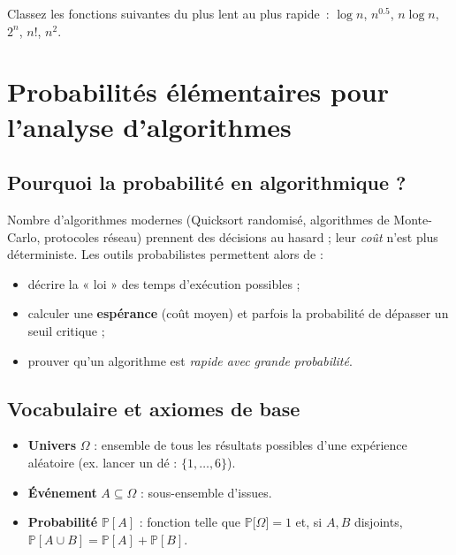 \begin{exercice}
Classez les fonctions suivantes du plus lent au plus rapide :
$\log n$, $n^{0.5}$, $n\log n$, $2^{n}$, $n!$, $n^{2}$.
\end{exercice}



\section{Probabilités élémentaires pour l’analyse d’algorithmes}

\subsection{Pourquoi la probabilité en algorithmique ?}
Nombre d’algorithmes modernes (Quicksort randomisé, algorithmes de Monte-Carlo,
protocoles réseau) prennent des décisions au hasard ; leur \emph{coût} n’est
plus déterministe.  Les outils probabilistes permettent alors de :
\begin{itemize}
  \item décrire la « loi » des temps d’exécution possibles ;
  \item calculer une \textbf{espérance} (coût moyen) et parfois la probabilité
        de dépasser un seuil critique ;
  \item prouver qu’un algorithme est \emph{rapide avec grande probabilité}.
\end{itemize}

\subsection{Vocabulaire et axiomes de base}
\begin{itemize}
  \item \textbf{Univers} $\Omega$ : ensemble de tous les résultats possibles
        d’une expérience aléatoire (ex. lancer un dé : $\{1,\dots,6\}$).
  \item \textbf{Événement} $A\subseteq\Omega$ : sous-ensemble d’issues.
  \item \textbf{Probabilité} \(\mathbb{P}[A]\) : fonction telle que
        \(\mathbb{P}\bigl[\Omega\bigr]=1\) et, si $A,B$ disjoints,
        \(\mathbb{P}[A\cup B]=\mathbb{P}[A]+\mathbb{P}[B]\).
\end{itemize}

